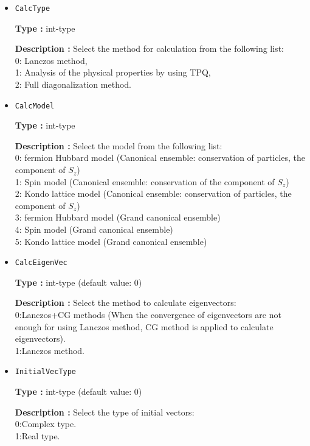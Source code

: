 \begin{itemize}
\item  \verb|CalcType|

{\bf Type :} int-type 

{\bf Description :} Select the method for calculation from the following list:\\
0: Lanczos method,\\
1: Analysis of the physical properties by using TPQ,\\
2: Full diagonalization method.\\

\item  \verb|CalcModel|

{\bf Type :} int-type 

{\bf Description :} Select the model from the following list:\\
0: fermion Hubbard model (Canonical ensemble: conservation of particles, the component of $S_z$)\\
1: Spin model (Canonical ensemble: conservation of the component of $S_z$)\\
2: Kondo lattice model (Canonical ensemble: conservation of particles, the component of $S_z$)\\
3: fermion Hubbard model (Grand canonical ensemble)\\
4: Spin model (Grand canonical ensemble)\\
5: Kondo lattice model (Grand canonical ensemble)

%
%

\item  \verb|CalcEigenVec|

{\bf Type :} int-type (default value: 0)

{\bf Description :} Select the method to calculate eigenvectors:\\
0:Lanczos+CG methods (When the convergence of eigenvectors are not enough for using Lanczos method,  CG method is applied to calculate eigenvectors).\\
1:Lanczos method.\\

\item  \verb|InitialVecType|

{\bf Type :} int-type (default value: 0)

{\bf Description :} Select the type of initial vectors:\\
0:Complex type.\\
1:Real type.\\

\end{itemize}

